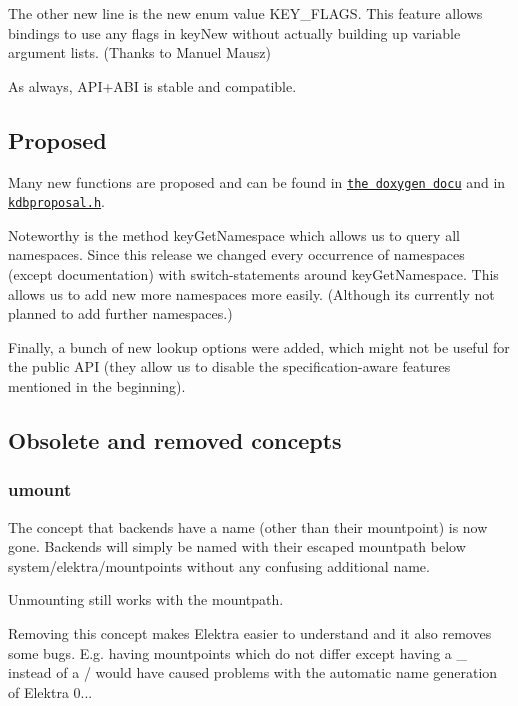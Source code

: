 The other new line is the new enum value {\ttfamily K\+E\+Y\+\_\+\+F\+L\+A\+GS}. This feature allows bindings to use any flags in key\+New without actually building up variable argument lists. (Thanks to Manuel Mausz)

As always, A\+P\+I+\+A\+BI is stable and compatible.

\subsection*{Proposed}

Many new functions are proposed and can be found in \href{https://doc.libelektra.org/api/0.8.11/html}{\tt the doxygen docu} and in \href{https://github.com/ElektraInitiative/libelektra/blob/master/src/include/kdbproposal.h}{\tt kdbproposal.\+h}.

Noteworthy is the method {\ttfamily key\+Get\+Namespace} which allows us to query all namespaces. Since this release we changed every occurrence of namespaces (except documentation) with switch-\/statements around {\ttfamily key\+Get\+Namespace}. This allows us to add new more namespaces more easily. (Although its currently not planned to add further namespaces.)

Finally, a bunch of new lookup options were added, which might not be useful for the public A\+PI (they allow us to disable the specification-\/aware features mentioned in the beginning).

\subsection*{Obsolete and removed concepts}

\subsubsection*{umount}

The concept that backends have a name (other than their mountpoint) is now gone. Backends will simply be named with their escaped mountpath below system/elektra/mountpoints without any confusing additional name.

Unmounting still works with the mountpath.

Removing this concept makes Elektra easier to understand and it also removes some bugs. E.\+g. having mountpoints which do not differ except having a {\ttfamily \+\_\+} instead of a {\ttfamily /} would have caused problems with the automatic name generation of Elektra 0...

